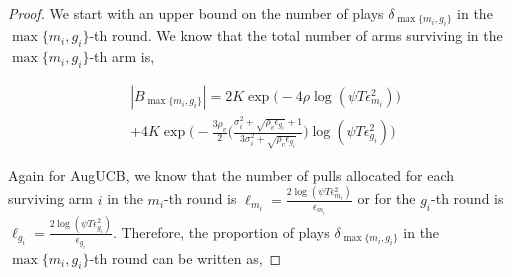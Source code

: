 \begin{proof}
  

We start with an upper bound on the number of plays $\delta_{\max\lbrace m_{i}, g_{i}\rbrace}$ in the $\max\lbrace m_{i}, g_{i}\rbrace$-th round. We know that the total number of arms surviving in the $\max\lbrace m_{i}, g_{i}\rbrace$-th arm is, 

\begin{small}
\begin{align*}
&|B_{\max\lbrace m_{i}, g_{i}\rbrace}|=2K\exp\bigg(-4\rho\log (\psi T\epsilon_{m_{i}}^{2})\bigg)\\ 
& + 4K\exp\bigg(- \frac{3\rho_v}{2} \big(\frac{\sigma_{i}^{2}+\sqrt{\rho_{v}\epsilon_{g_{i}}}+1}{3\sigma_{i}^{2}+\sqrt{\rho_v \epsilon_{g_{i}}}}\big) \log(\psi T\epsilon_{g_{i}}^{2}) \bigg)
\end{align*}     
\end{small}


Again for AugUCB, we know that the number of pulls allocated for each surviving arm $i$ in the $m_{i}$-th round is $\ell_{m_{i}}=\frac{2\log (\psi T \epsilon_{m_{i}}^{2})}{\epsilon_{m_{i}}}$ or for the $g_{i}$-th round is $\ell_{g_{i}}=\frac{2\log (\psi T \epsilon_{g_{i}}^{2})}{\epsilon_{g_{i}}}$. Therefore, the proportion of plays $\delta_{\max\lbrace m_{i}, g_{i}\rbrace}$ in the $\max\lbrace m_{i}, g_{i}\rbrace$-th round can be written as,


\end{proof}
